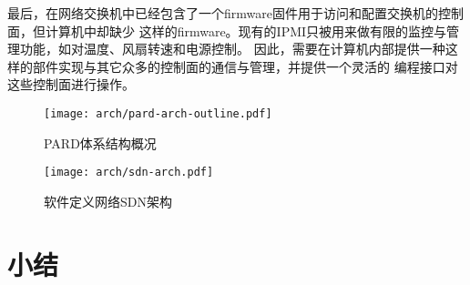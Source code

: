 最后，在网络交换机中已经包含了一个firmware固件用于访问和配置交换机的控制面，但计算机中却缺少
这样的firmware。现有的IPMI只被用来做有限的监控与管理功能，如对温度、风扇转速和电源控制。
因此，需要在计算机内部提供一种这样的部件实现与其它众多的控制面的通信与管理，并提供一个灵活的
编程接口对这些控制面进行操作。


\begin{figure}[tbh]
  \centering
  \texttt{[image: arch/pard-arch-outline.pdf]}
  \caption[PARD体系结构概况]{PARD体系结构概况}
  \label{fig:pard-arch-outline}
\end{figure}

\begin{figure}[tbh]
  \centering
  \texttt{[image: arch/sdn-arch.pdf]}
  \caption{软件定义网络SDN架构}
  \label{fig:pard-arch-outline}
\end{figure}

\section{小结}
